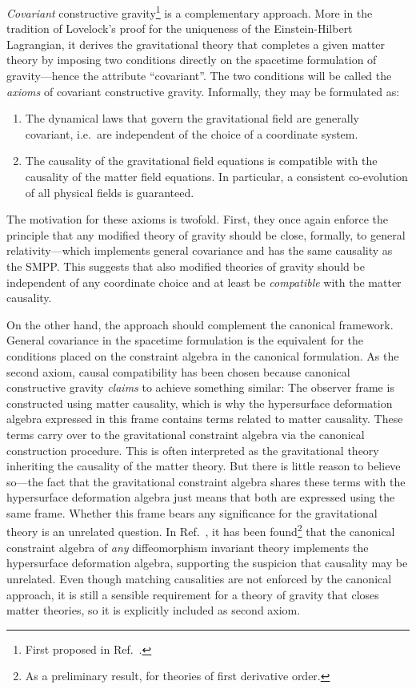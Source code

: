 \emph{Covariant} constructive gravity\footnote{First proposed in Ref.\ \cite{Alex_2020}.} is a complementary approach. More in the tradition of Lovelock's proof \cite{Lovelock_1969,Lovelock_1971,Lovelock_1972} for the uniqueness of the Einstein-Hilbert Lagrangian, it derives the gravitational theory that completes a given matter theory by imposing two conditions directly on the spacetime formulation of gravity---hence the attribute ``covariant''. The two conditions will be called the \emph{axioms} of covariant constructive gravity. Informally, they may be formulated as:
\begin{enumerate}
  \item The dynamical laws that govern the gravitational field are generally covariant, i.e.\ are independent of the choice of a coordinate system.
  \item The causality of the gravitational field equations is compatible with the causality of the matter field equations. In particular, a consistent co-evolution of all physical fields is guaranteed.
\end{enumerate}
The motivation for these axioms is twofold. First, they once again enforce the principle that any modified theory of gravity should be close, formally, to general relativity---which implements general covariance and has the same causality as the SMPP\@. This suggests that also modified theories of gravity should be independent of any coordinate choice and at least be \emph{compatible} with the matter causality.

On the other hand, the approach should complement the canonical framework. General covariance in the spacetime formulation is the equivalent for the conditions placed on the constraint algebra in the canonical formulation. As the second axiom, causal compatibility has been chosen because canonical constructive gravity \emph{claims} to achieve something similar: The observer frame is constructed using matter causality, which is why the hypersurface deformation algebra expressed in this frame contains terms related to matter causality. These terms carry over to the gravitational constraint algebra via the canonical construction procedure. This is often interpreted as the gravitational theory inheriting the causality of the matter theory. But there is little reason to believe so---the fact that the gravitational constraint algebra shares these terms with the hypersurface deformation algebra just means that both are expressed using the same frame. Whether this frame bears any significance for the gravitational theory is an unrelated question. In Ref.\ \cite{Reinhart_2019}, it has been found\footnote{As a preliminary result, for theories of first derivative order.} that the canonical constraint algebra of \emph{any} diffeomorphism invariant theory implements the hypersurface deformation algebra, supporting the suspicion that causality may be unrelated. Even though matching causalities are not enforced by the canonical approach, it is still a sensible requirement for a theory of gravity that closes matter theories, so it is explicitly included as second axiom.

